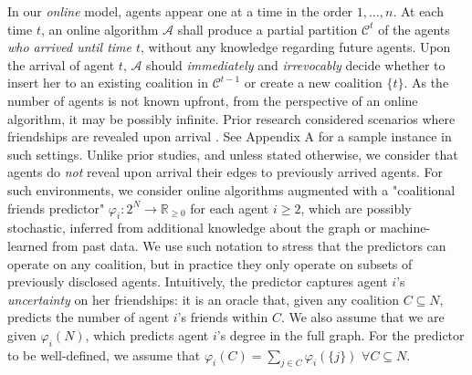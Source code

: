 \documentclass[letterpaper]{article} %
\begin{document}
In our \textit{{online}} model, agents appear one at a time in the order $1, \dots, n$. At each time $t$, an online algorithm $\mathcal{A}$ shall produce a partial partition $\mathcal{C}^t$ of the agents \textit{who arrived until time $t$}, without any knowledge regarding future agents. Upon the arrival of agent $t$, $\mathcal{A}$ should \textit{immediately} and \textit{irrevocably} decide whether to insert her to an existing coalition in $\mathcal{C}^{t-1}$ or create a new coalition $\{t\}$. As the number of agents is not known upfront, from the perspective of an online algorithm, it may be possibly infinite. Prior research considered scenarios where friendships are revealed upon arrival \cite{flammini2021online}. See Appendix A for a sample instance in such settings.  %
%
Unlike prior studies, and unless stated otherwise, we consider that agents do \textit{not} reveal upon arrival their edges to previously arrived agents. For such environments, we consider online algorithms augmented with a "coalitional friends predictor" $\varphi_i: 2^{N} \rightarrow \mathbb{R}_{\geq 0}$ for each agent $i \geq 2$, which are possibly stochastic, inferred from additional knowledge about the graph or machine-learned from past data. We use such notation to stress that the predictors can operate on any coalition, but in practice they only operate on subsets of previously disclosed agents. Intuitively, the predictor captures agent $i$'s \textit{uncertainty} on her friendships: it is an oracle that, given any coalition $C \subseteq N$, predicts the number of agent $i$'s friends within $C$. We also assume that we are given $\varphi_i(N)$, which predicts agent $i$'s degree in the full graph. For the predictor to be well-defined, we assume that $\varphi_i(C) = \sum_{j \in C} \varphi_i(\{j\})$ $\forall C \subseteq N$. %


\end{document}
